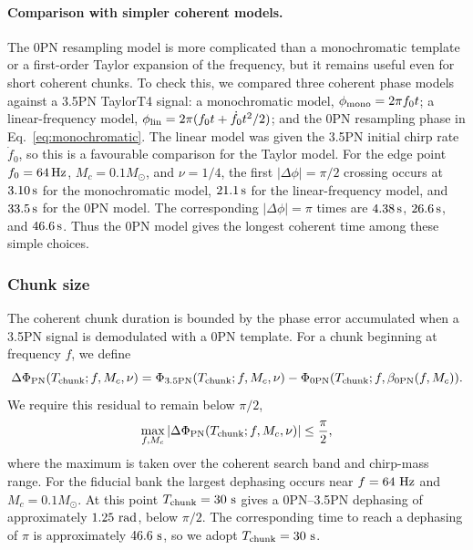\documentclass[aps,prd,amsmath,floats,floatfix, twocolumn,
superscriptaddress,nofootinbib,showpacs]{revtex4-2}
\begin{document}
\paragraph{Comparison with simpler coherent models.}
The 0PN resampling model is more complicated than a monochromatic template or a
first-order Taylor expansion of the frequency, but it remains useful even for
short coherent chunks.  To check this, we compared three coherent phase models
against a 3.5PN TaylorT4 signal: a monochromatic model,
$\phi_{\rm mono}=2\pi f_0t$; a linear-frequency model,
$\phi_{\rm lin}=2\pi(f_0t+\dot{f}_0t^2/2)$; and the 0PN resampling phase in
Eq.~\eqref{eq:monochromatic}.  The linear model was given the 3.5PN initial
chirp rate $\dot{f}_0$, so this is a favourable comparison for the Taylor
model.  For the edge point $f_0=64\,{\rm Hz}$, $M_c=0.1M_\odot$, and
$\nu=1/4$, the first $|\Delta\phi|=\pi/2$ crossing occurs at
$3.10\,{\rm s}$ for the monochromatic model, $21.1\,{\rm s}$ for the
linear-frequency model, and $33.5\,{\rm s}$ for the 0PN model.  The
corresponding $|\Delta\phi|=\pi$ times are $4.38\,{\rm s}$, $26.6\,{\rm s}$,
and $46.6\,{\rm s}$.  Thus the 0PN model gives the longest coherent time among
these simple choices.

\subsubsection{Chunk size}
The coherent chunk duration is bounded by the phase error accumulated when a
3.5PN signal is demodulated with a 0PN template.  For a chunk beginning at
frequency $f$, we define
\begin{equation}
\Delta\Phi_{\rm PN}(T_{\rm chunk};f,M_c,\nu)
=
\Phi_{\rm 3.5PN}(T_{\rm chunk};f,M_c,\nu)
-
\Phi_{\rm 0PN}(T_{\rm chunk};f,\beta_{\rm 0PN}(f,M_c)).
\end{equation}
We require this residual to remain below $\pi/2$,
\begin{equation}
\max_{f,M_c}
\left|
\Delta\Phi_{\rm PN}(T_{\rm chunk};f,M_c,\nu)
\right|
\leq \frac{\pi}{2},
\label{eq:chunk_size_condition}
\end{equation}
where the maximum is taken over the coherent search band and chirp-mass range.
For the fiducial bank the largest dephasing occurs near
$f=64~{\rm Hz}$ and $M_c=0.1M_\odot$.  At this point
$T_{\rm chunk}=30~{\rm s}$ gives a 0PN--3.5PN dephasing of approximately
$1.25~{\rm rad}$, below $\pi/2$.  The corresponding time to reach a dephasing
of $\pi$ is approximately $46.6~{\rm s}$, so we adopt
$T_{\rm chunk}=30~{\rm s}$.
\end{document}
